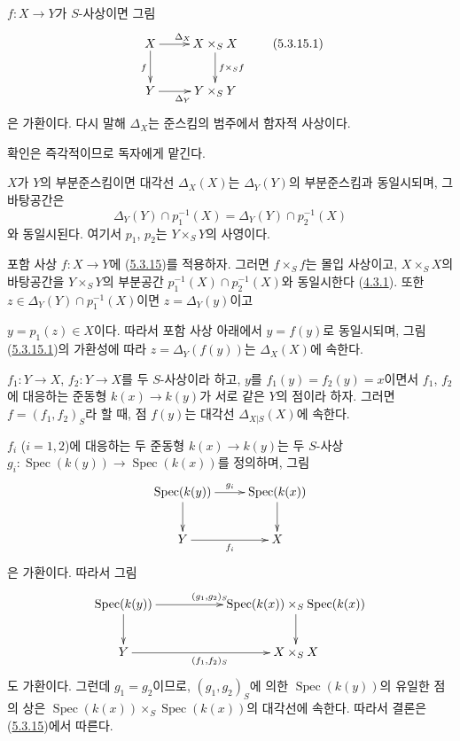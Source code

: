 \begin{proposition}[5.3.15]
\label{I.5.3.15-ko}
$f:X\to Y$가 $S$-사상이면 그림
\[
  \xymatrix{
    X\ar[r]^{\Delta_X}\ar[d]_f &
    X\times_S X\ar[d]^{f\times_S f}\\
    Y\ar[r]_{\Delta_Y} &
    Y\times_S Y
  }
  \tag{5.3.15.1}\label{I.5.3.15.1-ko}
\]
은 가환이다. 다시 말해 $\Delta_X$는 준스킴의 범주에서 함자적
사상이다.
\end{proposition}

확인은 즉각적이므로 독자에게 맡긴다.

\begin{corollary}[5.3.16]
\label{I.5.3.16-ko}
$X$가 $Y$의 부분준스킴이면 대각선 $\Delta_X(X)$는
$\Delta_Y(Y)$의 부분준스킴과 동일시되며, 그 바탕공간은
\[
  \Delta_Y(Y)\cap p_1^{-1}(X)=\Delta_Y(Y)\cap p_2^{-1}(X)
\]
와 동일시된다. 여기서 $p_1$, $p_2$는 $Y\times_S Y$의 사영이다.
\end{corollary}

포함 사상 $f:X\to Y$에 (\hyperref[I.5.3.15-ko]{5.3.15})를 적용하자.
그러면 $f\times_S f$는 몰입 사상이고, $X\times_S X$의 바탕공간을
$Y\times_S Y$의 부분공간
$p_1^{-1}(X)\cap p_2^{-1}(X)$와 동일시한다
(\hyperref[I.4.3.1-ko]{4.3.1}). 또한
$z\in\Delta_Y(Y)\cap p_1^{-1}(X)$이면 $z=\Delta_Y(y)$이고

$y=p_1(z)\in X$이다. 따라서 포함 사상 아래에서 $y=f(y)$로
동일시되며, 그림 (\hyperref[I.5.3.15.1-ko]{5.3.15.1})의 가환성에
따라 $z=\Delta_Y(f(y))$는 $\Delta_X(X)$에 속한다.

\begin{corollary}[5.3.17]
\label{I.5.3.17-ko}
$f_1:Y\to X$, $f_2:Y\to X$를 두 $S$-사상이라 하고, $y$를
$f_1(y)=f_2(y)=x$이면서 $f_1$, $f_2$에 대응하는 준동형
$k(x)\to k(y)$가 서로 같은 $Y$의 점이라 하자. 그러면
$f=(f_1,f_2)_S$라 할 때, 점 $f(y)$는 대각선
$\Delta_{X|S}(X)$에 속한다.
\end{corollary}

$f_i$ ($i=1,2$)에 대응하는 두 준동형 $k(x)\to k(y)$는 두
$S$-사상
$g_i:\operatorname{Spec}(k(y))\to\operatorname{Spec}(k(x))$를 정의하며,
그림
\[
  \xymatrix{
    \operatorname{Spec}(k(y))\ar[r]^{g_i}\ar[d] &
    \operatorname{Spec}(k(x))\ar[d]\\
    Y\ar[r]_{f_i} & X
  }
\]
은 가환이다. 따라서 그림
\[
  \xymatrix{
    \operatorname{Spec}(k(y))\ar[rr]^{(g_1,g_2)_S}\ar[d] & &
    \operatorname{Spec}(k(x))\times_S\operatorname{Spec}(k(x))\ar[d]\\
    Y\ar[rr]_{(f_1,f_2)_S} & & X\times_S X
  }
\]
도 가환이다. 그런데 $g_1=g_2$이므로, $(g_1,g_2)_S$에 의한
$\operatorname{Spec}(k(y))$의 유일한 점의 상은
$\operatorname{Spec}(k(x))\times_S\operatorname{Spec}(k(x))$의 대각선에
속한다. 따라서 결론은 (\hyperref[I.5.3.15-ko]{5.3.15})에서 따른다.


